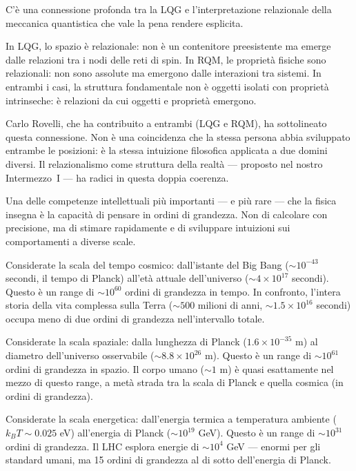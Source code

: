 \documentclass[12pt,a4paper,openany]{book}
\newcommand{\sezione}[1]{\vspace{1.2em}{\large\bfseries #1}\vspace{0.5em}\par}
\begin{document}
\sezione{Il problema dell'osservatore in LQG e il legame con il Capitolo II}

C'è una connessione profonda tra la LQG e l'interpretazione relazionale della meccanica quantistica che vale la pena rendere esplicita.

In LQG, lo spazio è relazionale: non è un contenitore preesistente ma emerge dalle relazioni tra i nodi delle reti di spin. In RQM, le proprietà fisiche sono relazionali: non sono assolute ma emergono dalle interazioni tra sistemi. In entrambi i casi, la struttura fondamentale non è oggetti isolati con proprietà intrinseche: è relazioni da cui oggetti e proprietà emergono.

Carlo Rovelli, che ha contribuito a entrambi (LQG e RQM), ha sottolineato questa connessione. Non è una coincidenza che la stessa persona abbia sviluppato entrambe le posizioni: è la stessa intuizione filosofica applicata a due domini diversi. Il relazionalismo come struttura della realtà --- proposto nel nostro Intermezzo~I --- ha radici in questa doppia coerenza.

\sezione{La fenomenologia della scala: imparare a pensare in ordini di grandezza}

Una delle competenze intellettuali più importanti --- e più rare --- che la fisica insegna è la capacità di pensare in ordini di grandezza. Non di calcolare con precisione, ma di stimare rapidamente e di sviluppare intuizioni sui comportamenti a diverse scale.

Considerate la scala del tempo cosmico: dall'istante del Big Bang ($\sim 10^{-43}$ secondi, il tempo di Planck) all'età attuale dell'universo ($\sim 4 \times 10^{17}$ secondi). Questo è un range di $\sim 10^{60}$ ordini di grandezza in tempo. In confronto, l'intera storia della vita complessa sulla Terra ($\sim 500$ milioni di anni, $\sim 1.5 \times 10^{16}$ secondi) occupa meno di due ordini di grandezza nell'intervallo totale.

Considerate la scala spaziale: dalla lunghezza di Planck ($1.6 \times 10^{-35}$ m) al diametro dell'universo osservabile ($\sim 8.8 \times 10^{26}$ m). Questo è un range di $\sim 10^{61}$ ordini di grandezza in spazio. Il corpo umano ($\sim 1$ m) è quasi esattamente nel mezzo di questo range, a metà strada tra la scala di Planck e quella cosmica (in ordini di grandezza).

Considerate la scala energetica: dall'energia termica a temperatura ambiente ($k_B T \sim 0.025$ eV) all'energia di Planck ($\sim 10^{19}$ GeV). Questo è un range di $\sim 10^{31}$ ordini di grandezza. Il LHC esplora energie di $\sim 10^{4}$ GeV --- enormi per gli standard umani, ma 15 ordini di grandezza al di sotto dell'energia di Planck.
\end{document}
